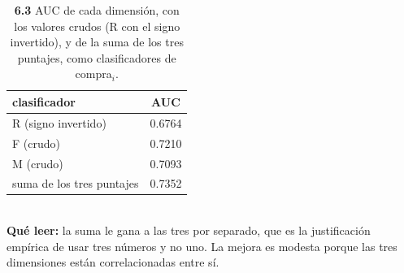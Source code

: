 \begin{table}[htbp]
\centering
\footnotesize
\caption{\textbf{6.3} AUC de cada dimensi\'on, con los valores crudos (R con el signo invertido), y de la suma de los tres puntajes, como clasificadores de compra$_i$.}
\label{tab:p6_auc}
\begin{tabular}{lc}
\toprule
\textbf{clasificador} & \textbf{AUC} \\
\midrule
R (signo invertido) & 0.6764 \\
F (crudo) & 0.7210 \\
M (crudo) & 0.7093 \\
suma de los tres puntajes & 0.7352 \\
\bottomrule
\end{tabular}
\\[0.3em]{\scriptsize \textbf{Qu\'e leer:} la suma le gana a las tres por separado, que es la justificaci\'on emp\'irica de usar tres n\'umeros y no uno. La mejora es modesta porque las tres dimensiones est\'an correlacionadas entre s\'i.}
\end{table}
